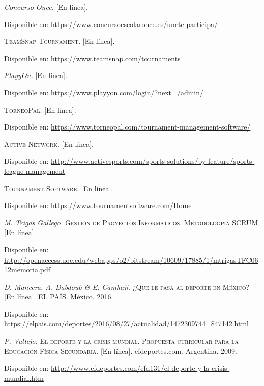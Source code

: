 \begin{thebibliography}{}
		\textsc{}
		\textit{Concurso Once.} [En línea].
		
		Disponible en:
		\url{https://www.concursoescolaronce.es/unete-participa/}

		\textit{}
		\textsc{TeamSnap Tournament.} [En línea].
		

		Disponible en:
		\url{https://www.teamsnap.com/tournaments}
		
		\textsc{}
		\textit{PlayyOn.} [En línea].
		

		Disponible en:
		\url{https://www.playyon.com/login/?next=/admin/}
		
		\textit{}
		\textsc{TorneoPal.} [En línea].
		
		
		Disponible en: 
		\url{ https://www.torneopal.com/tournament-management-software/}
		
		\textit{}
		\textsc{Active Network.} [En línea].
		 
		
		Disponible en: 
		\url{http://www.activesports.com/sports-solutions/by-feature/sports-league-management}
		
		\textit{}
		\textsc{Tournament Software.} [En línea].
		 
		
		Disponible en: 
		\url{https://www.tournamentsoftware.com/Home}
	
		\textit{M. Trigas Gallego.}
		\textsc{Gestión de Proyectos Informaticos. Metodologpia SCRUM.} [En línea].

		
		Disponible en: 
		\url{http://openaccess.uoc.edu/webapps/o2/bitstream/10609/17885/1/mtrigasTFC0612memoria.pdf}	
		
		\textit{D. Mancera, A. Dabdoub \& E. Camhaji.}
		\textsc{¿Que le pasa al deporte en México?} [En línea].
		 EL PAÍS. México. 2016.

		
		Disponible en: 
		\url{https://elpais.com/deportes/2016/08/27/actualidad/1472309744_847142.html}	

		\textit{P. Vallejo.}
		\textsc{El deporte y la crisis mundial. Propuesta curricular para la Educación Física Secundaria.} [En línea]. 
	    efdeportes.com. Argentina. 2009.
		
		Disponible en: 
		\url{http://www.efdeportes.com/efd131/el-deporte-y-la-crisis-mundial.htm}

\end{thebibliography}
